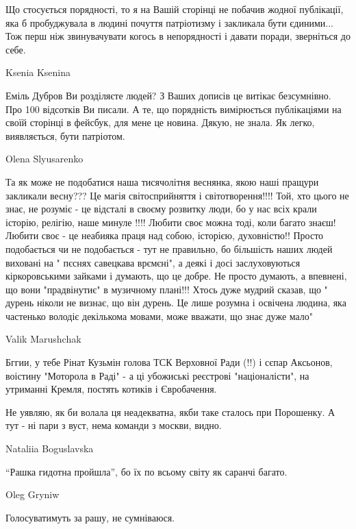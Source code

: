 Що стосується порядності, то я на Вашій сторінці не побачив жодної публікації,
яка б пробуджувала в людині почуття патріотизму і закликала бути єдиними... Тож
перш ніж звинувачувати когось в непорядності і давати поради, зверніться до
себе.

Ksenia Ksenina

Еміль Дубров Ви розділяєте людей? З Ваших дописів це витікає безсумнівно. Про
100 відсотків Ви писали. А те, що порядність вимірюється публікаціями на своїй
сторінці в фейсбук, для мене це новина. Дякую, не знала. Як легко, виявляється,
бути патріотом.

Olena Slyusarenko

Та як може не подобатися наша тисячолітня веснянка, якою наші пращури закликали
весну??? Це магія світосприйняття і світотворення!!!! Той, хто цього не знає,
не розуміє - це відсталі в своєму розвитку люди, бо у нас всіх крали історію,
релігію, наше минуле !!!! Любити своє можна тоді, коли багато знаєш! Любити
своє - це неабияка праця над собою, історією, духовністю!! Просто подобається
чи не подобається - тут не правильно, бо більшість наших людей виховані на "
пєснях савецкава врємєні", а деякі і досі заслуховуються кіркоровськими зайками
і думають, що це добре. Не просто думають, а впевнені, що вони "прадвінутиє" в
музичному плані!!! Хтось дуже мудрий сказав, що " дурень ніколи не визнає, що
він дурень. Це лише розумна і освічена людина, яка частенько володіє декількома
мовами, може вважати, що знає дуже мало"

Valik Marushchak

Бггии, у тебе Рінат Кузьмін голова ТСК Верховної Ради (!!) і сєпар Аксьонов,
воістину "Моторола в Раді" - а ці убожиські реєстрові "націоналісти", на
утриманні Кремля, постять котиків і Євробачення.

Не уявляю, як би волала ця неадекватна, якби таке сталось при Порошенку. А тут
- ні пари з вуст, нема команди з москви, видно.

Nataliia Boguslavska

\enquote{Рашка гидотна пройшла}, бо їх по всьому світу як саранчі багато.

Oleg Gryniw

Голосуватимуть за рашу, не сумніваюся.
